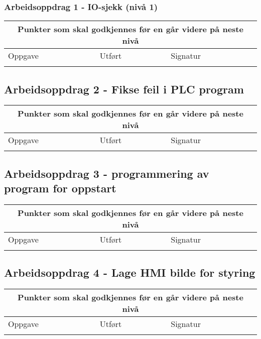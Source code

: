 \subsubsection*{Arbeidsoppdrag 1 - IO-sjekk (nivå 1)}

\begin{center} \begin{tabular}{ | m{8cm} | m{1cm}| m{2cm} | } 
\hline
\multicolumn{3}{|c|}{Punkter som skal godkjennes før en går videre på neste nivå} \\
	\hline
	Oppgave	& Utført & Signatur \\ 
	\hline
& & \\ 
	\hline
\end{tabular}
\end{center}
\newpage

\subsection*{Arbeidsoppdrag 2 - Fikse feil i PLC program}

\begin{center}
\begin{tabular}{ | m{8cm} | m{1cm}| m{2cm} | } 
\hline
\multicolumn{3}{|c|}{Punkter som skal godkjennes før en går videre på neste nivå} \\
	\hline
	Oppgave	& Utført & Signatur \\ 
	\hline
& & \\ 
	\hline
\end{tabular}
\end{center}
\newpage
\subsection*{Arbeidsoppdrag 3 - programmering av program for oppstart}

\begin{center}
\begin{tabular}{ | m{8cm} | m{1cm}| m{2cm} | } 
\hline
\multicolumn{3}{|c|}{Punkter som skal godkjennes før en går videre på neste nivå} \\
	\hline
	Oppgave	& Utført & Signatur \\ 
	\hline
& & \\ 
	\hline
\end{tabular}
\end{center}
\newpage

\subsection*{Arbeidsoppdrag 4 - Lage HMI bilde for styring}
\begin{center}
\begin{tabular}{ | m{8cm} | m{1cm}| m{2cm} | } 
\hline
\multicolumn{3}{|c|}{Punkter som skal godkjennes før en går videre på neste nivå} \\
	\hline
	Oppgave	& Utført & Signatur \\ 
	\hline
& & \\ 
	\hline
\end{tabular}
\end{center}
\newpage




